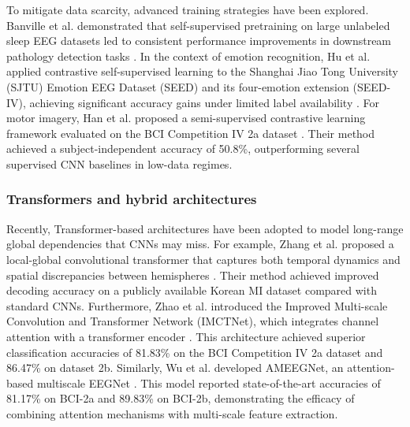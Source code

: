 \documentclass[a4paper,fleqn]{cas-dc}
\begin{document}
To mitigate data scarcity, advanced training strategies have been explored. Banville et al. demonstrated that self-supervised pretraining on large unlabeled sleep EEG datasets led to consistent performance improvements in downstream pathology detection tasks \citep{12banville2019selfsupervisedrepresentationlearningelectroencephalography}. In the context of emotion recognition, Hu et al. applied contrastive self-supervised learning to the Shanghai Jiao Tong University (SJTU) Emotion EEG Dataset (SEED) and its four-emotion extension (SEED-IV), achieving significant accuracy gains under limited label availability \citep{11hu2024contrastive}. For motor imagery, Han et al. proposed a semi-supervised contrastive learning framework evaluated on the BCI Competition IV 2a dataset \citep{13han2021semi}. Their method achieved a subject-independent accuracy of 50.8\%, outperforming several supervised CNN baselines in low-data regimes.

\subsubsection{Transformers and hybrid architectures}
Recently, Transformer-based architectures have been adopted to model long-range global dependencies that CNNs may miss. For example, Zhang et al. proposed a local-global convolutional transformer that captures both temporal dynamics and spatial discrepancies between hemispheres \citep{zhang2023local}. Their method achieved improved decoding accuracy on a publicly available Korean MI dataset compared with standard CNNs. Furthermore, Zhao et al. introduced the Improved Multi-scale Convolution and Transformer Network (IMCTNet), which integrates channel attention with a transformer encoder \citep{zhao2025multi}. This architecture achieved superior classification accuracies of 81.83\% on the BCI Competition IV 2a dataset and 86.47\% on dataset 2b. Similarly, Wu et al. developed AMEEGNet, an attention-based multiscale EEGNet \citep{wu2025ameegnet}. This model reported state-of-the-art accuracies of 81.17\% on BCI-2a and 89.83\% on BCI-2b, demonstrating the efficacy of combining attention mechanisms with multi-scale feature extraction. 
\end{document}
